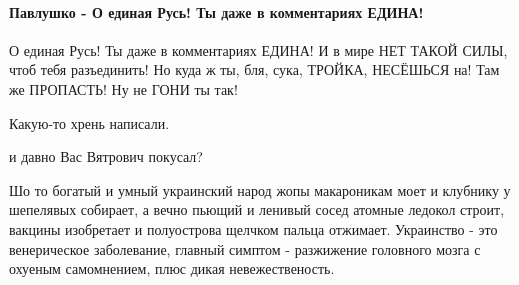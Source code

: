  
 
 
 
 
\paragraph{Павлушко - О единая Русь! Ты даже в комментариях ЕДИНА!}
\label{sec:14_07_2021.fb.krjukova_svetlana.1.statja_putina_mnenie.cmt.pavlushko_rus_jedinaja}

\begin{itemize}
 

О единая Русь! Ты даже в комментариях ЕДИНА! И в мире НЕТ ТАКОЙ СИЛЫ, чтоб тебя
разъединить! Но куда ж ты, бля, сука, ТРОЙКА, НЕСЁШЬСЯ на! Там же ПРОПАСТЬ! Ну
не ГОНИ ты так!

 
Какую-то хрень написали.

 
и давно Вас Вятрович покусал?

 

Шо то богатый и умный украинский народ жопы макароникам моет и клубнику у
шепелявых собирает, а вечно пьющий и ленивый сосед атомные ледокол строит,
вакцины изобретает и полуострова щелчком пальца отжимает. Украинство - это
венерическое заболевание, главный симптом - разжижение головного мозга с
охуеным самомнением, плюс дикая невежественость.


\end{itemize}
